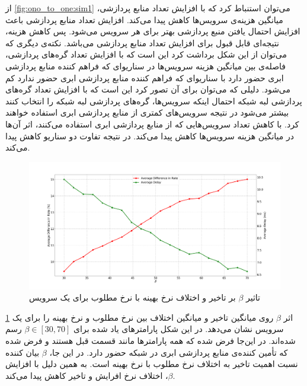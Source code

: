     از \cref{fig:ono_to_one:sim1} می‌توان استنباط کرد که با افزایش تعداد منابع پردازشی، میانگین هزینه‌ی سرویس‌ها کاهش پیدا می‌کند.
    افزایش تعداد منابع پردازشی باعث افزایش احتمال یافتن منبع پردازشی بهتر برای هر سرویس می‌شود.
    پس کاهش هزینه، نتیجه‌ای قابل قبول برای افزایش تعداد منابع پردازشی می‌باشد.
    نکته‌ی دیگری که می‌توان از این شکل برداشت کرد این است که با افزایش تعداد گره‌های پردازشی، فاصله‌ی بین میانگین هزینه سرویس‌ها در سناریو‌ای که فراهم کننده منابع پردازشی ابری حضور دارد با سناریو‌ای که فراهم کننده منابع پردازشی ابری حضور ندارد کم می‌شود.
    دلیلی که می‌توان برای آن تصور کرد این است که با افزایش تعداد گره‌های پردازشی لبه شبکه احتمال اینکه سرویس‌ها، گره‌های پردازشی لبه شبکه را انتخاب کنند بیشتر می‌شود در نتیجه سرویس‌های کمتری از منابع پردازشی ابری استفاده خواهند کرد.
    با کاهش تعداد سرویس‌هایی که از منابع پردازشی ابری استفاده می‌کنند، اثر آن‌ها در میانگین هزینه سرویس‌ها کاهش پیدا می‌کند.
    در نتیجه تفاوت دو سناریو کاهش پیدا می‌کند.

    \begin{figure}
      \centerline{\includegraphics[width=17cm]{graphics/one_to_one/sim_2}}
      \caption{تاثیر $\beta$ بر تاخیر و اختلاف نرخ بهینه با نرخ مطلوب برای یک سرویس}
      \label{fig:ono_to_one:sim2}
    \end{figure}

    \cref{fig:ono_to_one:sim2} اثر $\beta$ روی میانگین تاخیر و میانگین اختلاف بین نرخ مطلوب و نرخ بهینه را برای یک سرویس نشان می‌دهد.
    در این شکل پارامتر‌های یاد شده برای $\beta \in [30, 70]$ رسم شده‌اند.
    در این‌جا فرض شده که همه پارامتر‌ها مانند قسمت قبل هستند و فرض شده که تأمین کننده‌ی منابع پردازشی ابری در شبکه حضور دارد.
    در این جا، $\beta$ بیان کننده نسبت اهمیت تاخیر به اختلاف نرخ مطلوب با نرخ بهینه است.
    به همین دلیل با افزایش $\beta$، اختلاف نرخ افرایش و تاخیر کاهش پیدا می‌کند.
    
